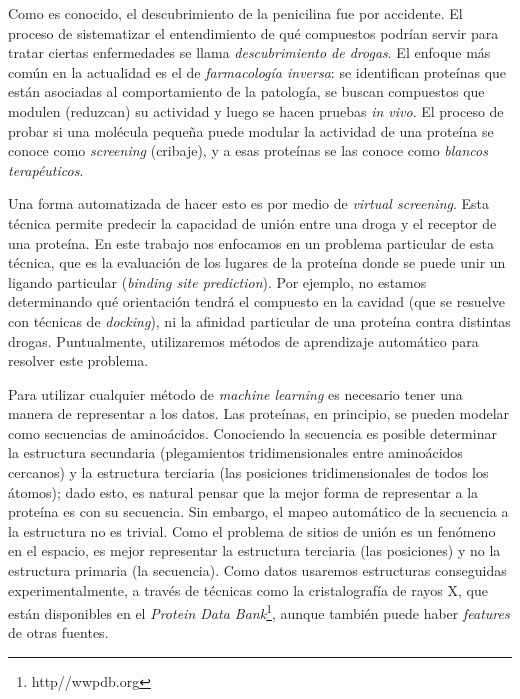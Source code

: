 \documentclass[
    left=2.0cm,         %
    right=2.0cm,        %
    top=2.0cm,          %
    bottom=2.5cm,         %
    bindingoffset=6mm,  %
    nohyphenation=false %
]{eiti/eiti-thesis}
\begin{document}
Como es conocido, el descubrimiento de la penicilina fue por accidente. El proceso
de sistematizar el entendimiento de qué compuestos podrían servir para tratar ciertas 
enfermedades se llama \textit{descubrimiento de drogas}. El enfoque más común en
la actualidad es el de \textit{farmacología inversa}: se identifican 
proteínas que están asociadas al comportamiento de la patología, 
se buscan compuestos que modulen
(reduzcan) su actividad y luego se hacen pruebas \textit{in vivo}. El proceso de
probar si una molécula pequeña puede modular la actividad de una proteína se
conoce como \textit{screening} (cribaje), y a esas proteínas se las conoce como
\textit{blancos terapéuticos}.

Una forma automatizada de hacer esto es por medio de \textit{virtual screening}.
Esta técnica permite predecir la capacidad de unión entre una droga y el 
receptor de una proteína.
En este trabajo nos enfocamos en un problema particular de esta técnica,
que es la evaluación de los lugares de la proteína donde se puede
unir un ligando particular (\textit{binding site prediction}). Por ejemplo,
no estamos determinando qué orientación tendrá el compuesto en la cavidad
(que se resuelve con técnicas de \textit{docking}), ni la afinidad
particular de una proteína contra distintas drogas. Puntualmente,
utilizaremos métodos de aprendizaje automático para resolver este problema.


Para utilizar cualquier método de \textit{machine learning} es necesario
tener una manera de representar a los datos. Las proteínas, en principio,
se pueden modelar como secuencias de aminoácidos. Conociendo la secuencia
es posible determinar la estructura secundaria (plegamientos tridimensionales
entre aminoácidos cercanos) y la estructura terciaria (las posiciones
tridimensionales de todos los átomos); dado esto, es natural pensar que
la mejor forma de representar a la proteína es con su secuencia.
Sin embargo, el mapeo automático de la secuencia a la
estructura no es trivial. Como el problema de sitios de unión es un
fenómeno en el espacio, es mejor representar la estructura terciaria 
(las posiciones) y no la estructura primaria (la secuencia).
Como datos usaremos estructuras conseguidas experimentalmente, a través de
técnicas como la cristalografía de rayos X, que están disponibles en el 
\textit{Protein Data Bank}\footnote{http//wwpdb.org}, aunque también puede 
haber \textit{features} de otras fuentes.
\end{document}
